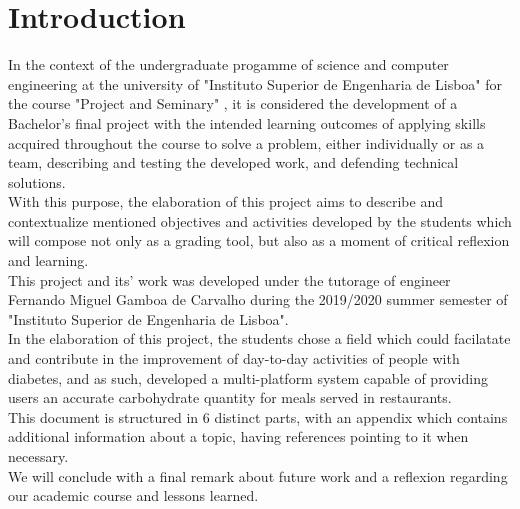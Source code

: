 %
%

\chapter{Introduction}

In the context of the undergraduate progamme of science and computer
engineering at the university of "Instituto Superior de Engenharia de Lisboa" 
for the course "Project and Seminary" \cite{ps},
it is considered the development of a Bachelor's final project with the 
intended learning outcomes of applying skills acquired 
throughout the course to solve a problem, either individually or as a team,
describing and testing the developed work, and defending technical solutions.\\

With this purpose, the elaboration of this project aims to describe and
contextualize mentioned objectives and activities developed by the students
which will compose not only as a grading tool, but also as a moment of critical 
reflexion and learning.\\

This project and its' work was developed under the tutorage of engineer 
Fernando Miguel Gamboa de Carvalho during the 2019/2020 summer semester of 
"Instituto Superior de Engenharia de Lisboa".\\

In the elaboration of this project, the students chose a field which could
facilatate and contribute in the improvement of day-to-day activities of people
with diabetes, and as such, developed a multi-platform system capable of 
providing users an accurate carbohydrate quantity for meals served in restaurants.\\

This document is structured in 6 distinct parts, with an appendix which contains additional
information about a topic, having references pointing to it when necessary.\\

We will conclude with a final remark about future work 
and a reflexion regarding our academic course and lessons learned.\\